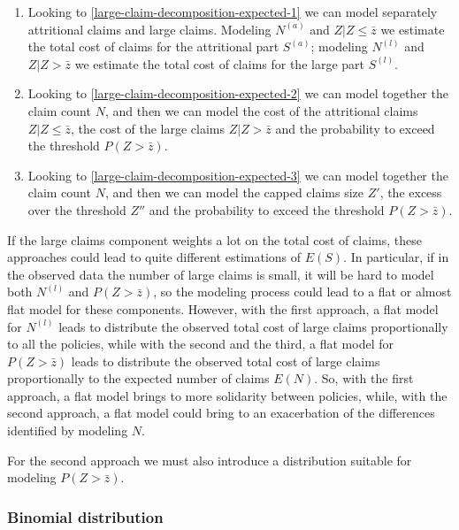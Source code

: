 \documentclass[a4paper, nobind]{templates/ociamthesis}
\providecommand{\tightlist}{%
  \setlength{\itemsep}{0pt}\setlength{\parskip}{0pt}}
\theoremstyle{definition}
\theoremstyle{definition}
\theoremstyle{definition}
\theoremstyle{remark}
\begin{document}
\begin{enumerate}
\def\labelenumi{\arabic{enumi}.}
\tightlist
\item
  Looking to \ref{large-claim-decomposition-expected-1} we can model separately attritional claims and large claims. Modeling \(N^{(a)}\) and \(Z|Z\le\bar{z}\) we estimate the total cost of claims for the attritional part \(S^{(a)}\); modeling \(N^{(l)}\) and \(Z|Z>\bar{z}\) we estimate the total cost of claims for the large part \(S^{(l)}\).
\item
  Looking to \ref{large-claim-decomposition-expected-2} we can model together the claim count \(N\), and then we can model the cost of the attritional claims \(Z|Z\le\bar{z}\), the cost of the large claims \(Z|Z>\bar{z}\) and the probability to exceed the threshold \(P(Z>\bar{z})\).
\item
  Looking to \ref{large-claim-decomposition-expected-3} we can model together the claim count \(N\), and then we can model the capped claims size \(Z'\), the excess over the threshold \(Z''\) and the probability to exceed the threshold \(P(Z>\bar{z})\).
\end{enumerate}

If the large claims component weights a lot on the total cost of claims, these approaches could lead to quite different estimations of \(E(S)\). In particular, if in the observed data the number of large claims is small, it will be hard to model both \(N^{(l)}\) and \(P(Z>\bar{z})\), so the modeling process could lead to a flat or almost flat model for these components. However, with the first approach, a flat model for \(N^{(l)}\) leads to distribute the observed total cost of large claims proportionally to all the policies, while with the second and the third, a flat model for \(P(Z>\bar{z})\) leads to distribute the observed total cost of large claims proportionally to the expected number of claims \(E(N)\). So, with the first approach, a flat model brings to more solidarity between policies, while, with the second approach, a flat model could bring to an exacerbation of the differences identified by modeling \(N\).

For the second approach we must also introduce a distribution suitable for modeling \(P(Z>\bar{z})\).

\hypertarget{binomial-distribution}{%
\subsubsection{Binomial distribution}\label{binomial-distribution}}
\end{document}
